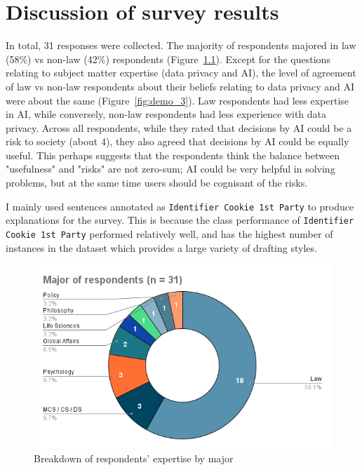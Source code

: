 \chapter{Discussion of survey results}
\label{chapter4}

In total, 31 responses were collected. The majority of respondents majored in law (58\%) vs non-law (42\%) respondents (Figure~\ref{fig:demo_1}). Except for the questions relating to subject matter expertise (data privacy and AI), the level of agreement of law vs non-law respondents about their beliefs relating to data privacy and AI were about the same (Figure~\ref{fig:demo_3}). Law respondents had less expertise in AI, while conversely, non-law respondents had less experience with data privacy. Across all respondents, while they rated that decisions by AI could be a risk to society (about 4), they also agreed that decisions by AI could be equally useful. This perhaps suggests that the respondents think the balance between "usefulness" and "risks" are not zero-sum; AI could be very helpful in solving problems, but at the same time users should be cognisant of the risks.

I mainly used sentences annotated as \texttt{Identifier Cookie 1st Party} to produce explanations for the survey. This is because the class performance of \texttt{Identifier Cookie 1st Party} performed relatively well, and has the highest number of instances in the dataset which provides a large variety of drafting styles.

\begin{figure}[!ht]
  \centering
  \includegraphics[width=0.85\linewidth]{figures/major_respondents.png}
  \caption{Breakdown of respondents' expertise by major}
  \label{fig:demo_1}
\end{figure}

